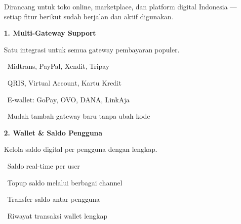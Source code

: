 \documentclass[a4paper]{article}
\begin{document}
{\fontsize{9.5}{13}\selectfont\color{TextLight}
Dirancang untuk toko online, marketplace, dan platform digital Indonesia --- setiap fitur berikut sudah berjalan dan aktif digunakan.}

\vspace{6pt}

\noindent
\begin{minipage}[t]{0.485\textwidth}
    \colorbox{GreenPrimary}{%
        \begin{minipage}{\dimexpr\textwidth-14pt}
            \vspace{5pt}
            {\fontsize{10}{13}\selectfont\bfseries\color{White} 1. Multi-Gateway Support}
            \vspace{5pt}
        \end{minipage}}
    \vspace{5pt}
    {\fontsize{9}{12}\selectfont\color{TextDark}%
    Satu integrasi untuk semua gateway pembayaran populer.\par\vspace{3pt}
    \textbullet\ Midtrans, PayPal, Xendit, Tripay\par\vspace{2pt}%
    \textbullet\ QRIS, Virtual Account, Kartu Kredit\par\vspace{2pt}%
    \textbullet\ E-wallet: GoPay, OVO, DANA, LinkAja\par\vspace{2pt}%
    \textbullet\ Mudah tambah gateway baru tanpa ubah kode}%
\end{minipage}%
\hfill
\begin{minipage}[t]{0.485\textwidth}
    \colorbox{BluePrimary}{%
        \begin{minipage}{\dimexpr\textwidth-14pt}
            \vspace{5pt}
            {\fontsize{10}{13}\selectfont\bfseries\color{White} 2. Wallet \& Saldo Pengguna}
            \vspace{5pt}
        \end{minipage}}
    \vspace{5pt}
    {\fontsize{9}{12}\selectfont\color{TextDark}%
    Kelola saldo digital per pengguna dengan lengkap.\par\vspace{3pt}
    \textbullet\ Saldo real-time per user\par\vspace{2pt}%
    \textbullet\ Topup saldo melalui berbagai channel\par\vspace{2pt}%
    \textbullet\ Transfer saldo antar pengguna\par\vspace{2pt}%
    \textbullet\ Riwayat transaksi wallet lengkap}%
\end{minipage}
\end{document}
